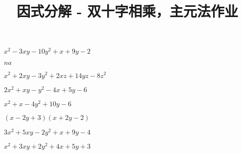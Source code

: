 \documentclass[windows,csize4]{BHCexam}
\title{因式分解 - 双十字相乘，主元法作业}
\begin{document}
\maketitle


\begin{groups}

    \begin{questions}[]

        \begin{multicols}{2}
            \question[5] $x^2-3xy-10y^2+x+9y-2$
            \begin{solution}{0.5cm}
                \methodonly $na$
            \end{solution}

            \question[5] $x^2+2xy-3y^2+2xz+14yz-8z^2$
            \begin{solution}{0.5cm}
                \methodonly
            \end{solution}
        \end{multicols}
        \vspace{3.5cm}

        \begin{multicols}{2}
            \question[5] $2x^2+xy-y^2-4x+5y-6$
            \begin{solution}{0.5cm}
                \methodonly
            \end{solution}

            \question[5] $x^2+x-4 y^2+10 y-6$
            \begin{solution}{0.5cm}
                \methodonly $(x-2 y+3) (x+2 y-2)$
            \end{solution}
        \end{multicols}
        \vspace{3.5cm}

        \begin{multicols}{2}
            \question[5] $3x^2+5xy-2y^2+x+9y-4$
            \begin{solution}{0.5cm}
                \methodonly
            \end{solution}

            \question[5] $x^2+3xy+2y^2+4x+5y+3$
            \begin{solution}{0.5cm}
                \methodonly
            \end{solution}
        \end{multicols}
        \vspace{3.5cm}




    \end{questions}

\end{groups}
\label{lastpage}
\end{document}
